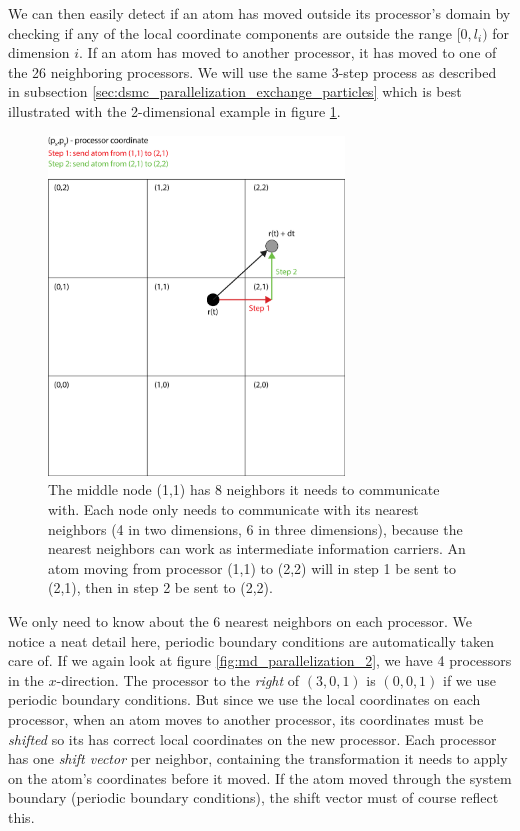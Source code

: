 We can then easily detect if an atom has moved outside its processor's domain by checking if any of the local coordinate components are outside the range $[0, l_i)$ for dimension $i$. If an atom has moved to another processor, it has moved to one of the 26 neighboring processors. We will use the same 3-step process as described in subsection \ref{sec:dsmc_parallelization_exchange_particles} which is best illustrated with the 2-dimensional example in figure \ref{fig:md_parallelization_facet_technique}.
\begin{figure}[h!]
\begin{center}
\includegraphics[width=0.7\textwidth, trim=0cm 0cm 0cm 0cm, clip]{MD/figures/parallelization_facet_technique.eps}
\end{center}
\caption{The middle node (1,1) has 8 neighbors it needs to communicate with. Each node only needs to communicate with its nearest neighbors (4 in two dimensions, 6 in three dimensions), because the nearest neighbors can work as intermediate information carriers. An atom moving from processor (1,1) to (2,2) will in step 1 be sent to (2,1), then in step 2 be sent to (2,2).}
\label{fig:md_parallelization_facet_technique}
\end{figure}
We only need to know about the 6 nearest neighbors on each processor. We notice a neat detail here, periodic boundary conditions are automatically taken care of. If we again look at figure \ref{fig:md_parallelization_2}, we have 4 processors in the $x$-direction. The processor to the \textit{right} of $(3,0,1)$ is $(0,0,1)$ if we use periodic boundary conditions. But since we use the local coordinates on each processor, when an atom moves to another processor, its coordinates must be \textit{shifted} so its has correct local coordinates on the new processor. Each processor has one \textit{shift vector} per neighbor, containing the transformation it needs to apply on the atom's coordinates before it moved. If the atom moved through the system boundary (periodic boundary conditions), the shift vector must of course reflect this. 